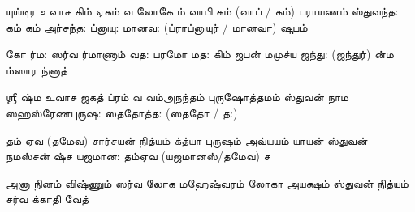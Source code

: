 \documentclass[10pt]{article}
\begin{document}
{\newpage
\slokad
{யுஶ்டிர உவாச}
{கிம் \hdspc ஏகம் வ லோகே} {ம் வாபி \hdspc {}கம் (வாப் / கம்) பராயணம்}
{ஸ்துவந்த: கம் கம் \hdspc அர்சந்த:} {ப்னுயு: \hdspc மானவ: (ப்ராப்னுயுர் / மானவா) ஷுபம்}

\slokas
{கோ ர்ம: ஸர்வ ர்மாணாம்}{ வத: பரமோ மத:}
{கிம் ஜபன் \hdspc மமுச்ய ஜந்து: (ஜந்துர்)}{ ன்ம ம்ஸார ந்னாத்}

\slokad 
{ஶ்ரீ ஷ்ம உவாச}
{ஜகத் ப்ரம் வ வம்}{அநந்தம் புருஷோத்தமம்}
{ஸ்துவன் \hdspc நாம ஸஹஸ்ரேண}{புருஷ: ஸததோத்த: (ஸததோ / த:)}

\slokas
{தம் \hdspc ஏவ (தமேவ) சார்சயன் \hdspc நித்யம்} {க்த்யா புருஷம் \hdspc அவ்யயம்}
{யாயன் ஸ்துவன் நமஸ்சன் \hdspc ஷ்ச} {யஜமான: தம்\hdspc ஏவ (யஜமானஸ்/தமேவ) ச}

\slokas
{அனா நினம் விஷ்ணும்} {ஸர்வ லோக மஹேஷ்வரம்}
{லோகா \hdspc அயக்ஷம் ஸ்துவன் \hdspc நித்யம்} {சர்வ க்காதி வேத்}




} 
\end{document}

